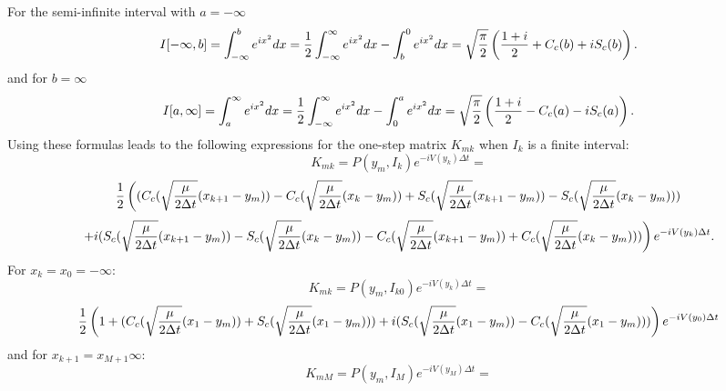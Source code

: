 \documentclass[aps,prc,reprint,noshowpacs,groupedaddress,onecolumn]{revtex4}
\def\beq{\begin{equation}}
\def\eeq{\end{equation}}
\begin{document}
For the semi-infinite interval with  
$a=-\infty$
\beq
I[-\infty,b] = \int_{-\infty}^b e^{ix^2} dx =
{1 \over 2} \int_{-\infty}^{\infty} e^{ix^2} dx - \int_b^0 e^{ix^2} dx =
\sqrt{{\pi \over 2}} \left ({1+i \over 2} + C_c(b)+i S_c(b) \right ) .
\label{f.11}
\eeq
and for $b=\infty$
\beq
I[a,\infty] = \int_a^{\infty} e^{ix^2} dx =
{1 \over 2} \int_{-\infty}^{\infty} e^{ix^2} dx - \int_0^a e^{ix^2} dx =
\sqrt{{\pi \over 2}} \left ({1+i \over 2} - C_c(a)-i S_c(a) \right ) .
\label{f.11}
\eeq
Using these formulas leads to the following expressions for 
the one-step matrix $K_{mk}$ when $I_k$ is a finite interval:
\[
K_{mk} =
P(y_{m},I_{k})  e^{ -i V(y_{k}) \Delta t} =
\]
\[ 
{1 \over 2}
\left (
(C_{c}(\sqrt{{\mu \over 2\Delta t}}(x_{k+1}-y_m))- 
C_{c}(\sqrt{{\mu \over 2\Delta t}}(x_{k}-y_m)) +
S_{c}(\sqrt{{\mu \over 2\Delta t}}(x_{k+1}-y_m))- 
S_{c}(\sqrt{{\mu \over 2\Delta t}}(x_{k}-y_m)))
\right . 
\]
\beq
\left .
+i (S_{c}(\sqrt{{\mu \over 2\Delta t}}(x_{k+1}-y_m))-
S_{c}(\sqrt{{\mu \over 2\Delta t}}(x_{k}-y_m))- 
C_{c}(\sqrt{{\mu \over 2\Delta t}}(x_{k+1}-y_m))+ 
C_{c}(\sqrt{{\mu \over 2\Delta t}}(x_{k}-y_m)))
\right ) e^{ -i V(y_{k}) \Delta t} . 
\label{f.12}
\eeq
For $x_{k}=x_0= -\infty $:
\[
K_{mk} =
P(y_{m},I_{k0})  e^{ -i V(y_{k}) \Delta t}
=
\]
\beq
{1  \over 2}
\left ( 1 +
(C_{c}(\sqrt{{\mu \over 2\Delta t}}(x_1-y_m))+
S_{c}(\sqrt{{\mu \over 2\Delta t}}(x_1-y_m)))
+i (
S_{c}(\sqrt{{\mu \over 2\Delta t}}(x_1-y_m)) -
C_{c}(\sqrt{{\mu \over 2\Delta t}}(x_1-y_m)))
\right) 
e^{ -i V(y_{0}) \Delta t} 
\label{f.13}
\eeq
and for $x_{k+1}=x_{M+1} \infty $:
\[
K_{mM} =
P(y_{m},I_{M})  e^{ -i V(y_{M}) \Delta t} = 
\]
\end{document}
